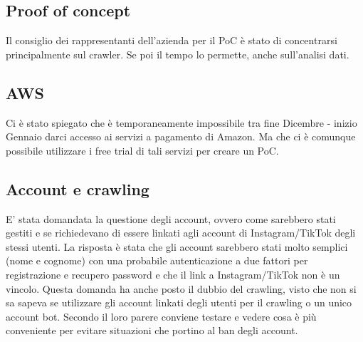\subsection{Proof of concept}

Il consiglio dei rappresentanti dell'azienda per il PoC è stato di concentrarsi principalmente sul crawler.  Se poi il tempo lo permette, anche sull'analisi dati.

\subsection{AWS}

Ci è stato spiegato che è temporaneamente impossibile tra fine Dicembre - inizio Gennaio darci accesso ai servizi a pagamento di Amazon. Ma che ci è comunque possibile utilizzare i free trial di tali servizi per creare un PoC.

\subsection{Account e crawling}

E' stata domandata la questione degli account, ovvero come sarebbero stati gestiti e se richiedevano di essere linkati agli account di Instagram/TikTok degli stessi utenti. La risposta è stata che gli account sarebbero stati molto semplici (nome e cognome) con una probabile autenticazione a due fattori per registrazione e recupero password e che il link a Instagram/TikTok non è un vincolo.
Questa domanda ha anche posto il dubbio del crawling, visto che non si sa sapeva se utilizzare gli account linkati degli utenti per il crawling o un unico account bot. Secondo il loro parere conviene testare e vedere cosa è più conveniente per evitare situazioni che portino al ban degli account.